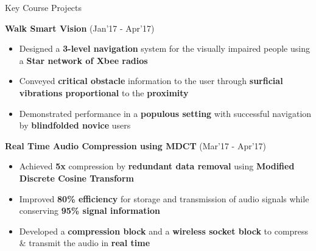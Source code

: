 \documentclass{resume}
\newcommand{\sepval}{-0.5em}
\begin{document}
\begin{rSection}{Key Course Projects}
\begin{itemize}[leftmargin=*]
\end{itemize}

\vspace{-0.1cm}
\item {\bf Walk Smart Vision} \hfill {(Jan'17 - Apr'17)}\\
[-0.4cm]

\begin{itemize}[leftmargin=*]

	\itemsep \sepval

	
	\item Designed a {\bf 3-level navigation} system for the visually impaired people using a {\bf Star network of Xbee radios}
	
	\item Conveyed {\bf critical obstacle} information to the user through {\bf surficial vibrations proportional} to the {\bf proximity}
      
	\item Demonstrated performance in a {\bf populous setting} with successful navigation by {\bf blindfolded novice} users   
	
\end{itemize}


\vspace{-0.1cm}

\item {\bf{Real Time Audio Compression using MDCT}} \hfill{(Mar'17 - Apr'17)}\\
[-0.4cm]

\begin{itemize}[leftmargin=*]

	\itemsep \sepval

	\item Achieved {\bf 5x} compression by {\bf redundant data removal} using {\bf{Modified Discrete Cosine Transform}}

	\item Improved {\bf 80\% efficiency} for storage and transmission of audio signals while conserving {\bf 95\% signal information}

	\item Developed a {\bf compression block} and a {\bf wireless socket block} to compress \& transmit the audio in {\bf real time}

\end{itemize}

\end{rSection}
\end{document}
